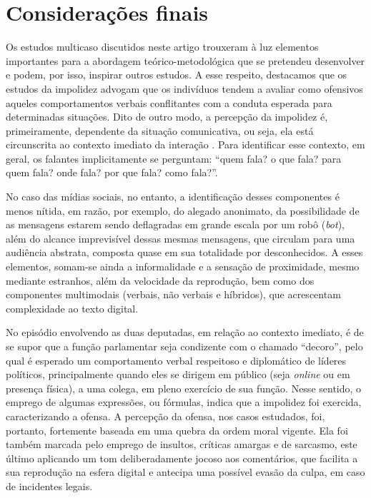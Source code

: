 \documentclass[portuguese]{textolivre}
\begin{document}
\section{Considerações finais}\label{sec-conclusao}
Os estudos multicaso discutidos neste artigo trouxeram à luz elementos importantes para a abordagem teórico-metodológica que se pretendeu desenvolver e podem, por isso, inspirar outros estudos. A esse respeito, destacamos que os estudos da impolidez advogam que os indivíduos tendem a avaliar como ofensivos aqueles comportamentos verbais conflitantes com a conduta esperada para determinadas situações. Dito de outro modo, a percepção da impolidez é, primeiramente, dependente da situação comunicativa, ou seja, ela está circunscrita ao contexto imediato da interação \cite{culpeper2010, culpeper2011}. Para identificar esse contexto, em geral, os falantes implicitamente se perguntam: ``quem fala? o que fala? para quem fala? onde fala? por que fala? como fala?''.

No caso das mídias sociais, no entanto, a identificação desses componentes é menos nítida, em razão, por exemplo, do alegado anonimato, da possibilidade de as mensagens estarem sendo deflagradas em grande escala por um robô (\textit{bot}), além do alcance imprevisível dessas mesmas mensagens, que circulam para uma audiência abstrata, composta quase em sua totalidade por desconhecidos. A esses elementos, somam-se ainda a informalidade e a sensação de proximidade, mesmo mediante estranhos, além da velocidade da reprodução, bem como dos componentes multimodais (verbais, não verbais e híbridos), que acrescentam complexidade ao texto digital.  

No episódio envolvendo as duas deputadas, em relação ao contexto imediato, é de se supor que a função parlamentar seja condizente com o chamado ``decoro'', pelo qual é esperado um comportamento verbal respeitoso e diplomático de líderes políticos, principalmente quando eles se dirigem em público (seja \textit{online} ou em presença física), a uma colega, em pleno exercício de sua função. Nesse sentido, o emprego de algumas expressões, ou fórmulas, indica que a impolidez foi exercida, caracterizando a ofensa. A percepção da ofensa, nos casos estudados, foi, portanto, fortemente baseada em uma quebra da ordem moral vigente. Ela foi também marcada pelo emprego de insultos, críticas amargas e de sarcasmo, este último aplicando um tom deliberadamente jocoso aos comentários, que facilita a sua reprodução na esfera digital e antecipa uma possível evasão da culpa, em caso de incidentes legais.
\end{document}
